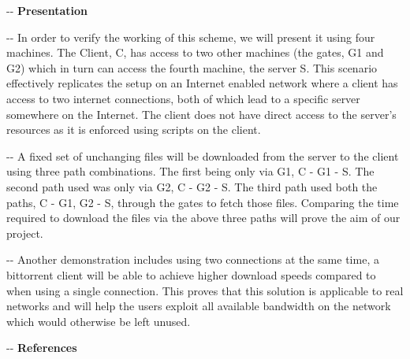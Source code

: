\documentclass[12pt]{article}
\makeatletter
\newenvironment{indentation}[3]%
	{\par\setlength{\parindent}{#3}
	\setlength{\leftmargin}{#1}       \setlength{\rightmargin}{#1}%
	\advance\linewidth -\leftmargin       \advance\linewidth -\rightmargin%
	\advance\@totalleftmargin\leftmargin  \@setpar{{\@@par}}%
	\parshape 1\@totalleftmargin \linewidth\ignorespaces}{\par}%
\makeatother
\begin{document}
\begin{indentation}{0pt}{0pt}{0pt}
\vspace{1cm}
\textbf{{{\Large Presentation}}}
\end{indentation}
\vspace{0.5cm}
\begin{indentation}{0pt}{0pt}{0pt}
{\normalsize \hspace{1cm} In order to verify the working of this scheme, we will present it using four machines. The Client, C, has access to two other machines (the gates, G1 and G2) which in turn can access the fourth machine, the server S. This scenario effectively replicates the setup on an Internet enabled network where a client has access to two internet connections, both of which lead to a specific server somewhere on the Internet. The client does not have direct access to the server's resources as it is enforced using scripts on the client.}
\end{indentation}

\begin{indentation}{0pt}{0pt}{0pt}
{\normalsize \hspace{1cm} A fixed set of unchanging files will be downloaded from the server to the client using three path combinations. The first being only via G1, C - G1 - S. The second path used was only via G2, C - G2 - S. The third path used both the paths, C - G1, G2 - S,  through the gates to fetch those files. Comparing the time required to download the files via the above three paths will prove the aim of our project.}
\end{indentation}

\begin{indentation}{0pt}{0pt}{0pt}
{\normalsize \hspace{1cm} Another demonstration includes using two connections at the same time, a bittorrent client will be able to achieve higher download speeds compared to when using a single connection. This proves that this solution is applicable to real networks and will help the users exploit all available bandwidth on the network which would otherwise be left unused.}
\end{indentation}

\pagebreak

\begin{indentation}{0pt}{0pt}{0pt}
\textbf{{{\Large References}}}
\end{indentation}

\vspace{1.5cm}
\end{document}
